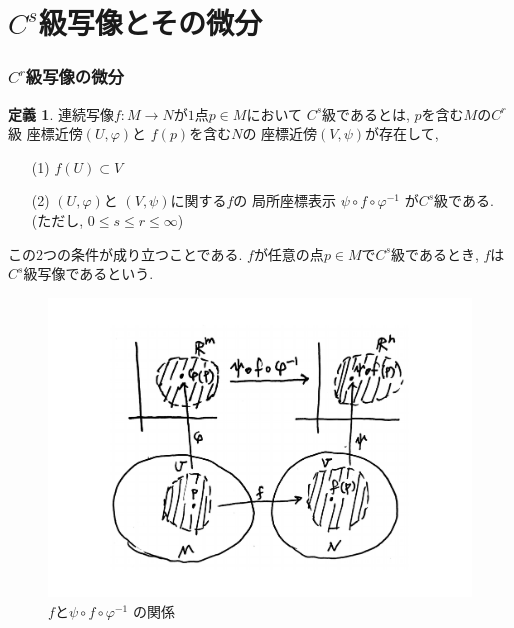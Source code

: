 \documentclass[dvipdfmx,cjk]{beamer}
\theoremstyle{definition}
\newtheorem{dfn}{\textbf{ 定義 }}
\newtheorem{prop}[dfn]{\textbf{ 命題 }}
\begin{document}
\section*{$C^s$級写像とその微分}
\begin{frame}
    \frametitle{$C^r$級写像の微分}
  \begin{dfn}\label{def:C^s map}
    連続写像$f:M\to N$が$1$点$p\in M$において
    $C^s$級であるとは, $p$を含む$M$の$C^r$級
    座標近傍$(U,\varphi)$と
    $f(p)$を含む$N$の
    座標近傍$(V,\psi)$が存在して, 
    \begin{itemize}
        \item[(1)]$f(U)\subset V$
        \item[(2)]$(U,\varphi)$と
        $(V,\psi)$に関する$f$の
        局所座標表示
        $\psi\circ f\circ \varphi^{-1}$
        が$C^s$級である.
        (ただし, $0\leq s \leq r \leq \infty$) 
    \end{itemize}
    この$2$つの条件が成り立つことである. 
    $f$が任意の点$p\in M$で$C^s$級であるとき, 
    $f$は$C^s$級写像であるという. 
  \end{dfn}
  \begin{figure}[H]
    \centering
    \includegraphics[keepaspectratio, scale=0.15]
         {Csmap.pdf}
    \caption{$f$と$\psi\circ f\circ \varphi^{-1}$
    の関係}
    \label{Csmap}
  \end{figure}
\end{frame}

\end{document}
